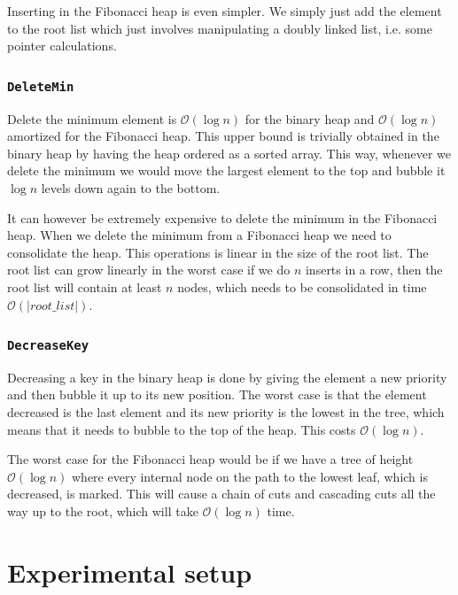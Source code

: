 \documentclass[a4paper,oneside,article,11pt]{memoir}
\begin{document}
Inserting in the Fibonacci heap is even simpler. We simply just add the element to the root list which just involves manipulating a doubly linked list, i.e. some pointer calculations. 

\subsection{\texttt{DeleteMin}}
Delete the minimum element is $\mathcal{O}(\log{n})$ for the binary heap and $\mathcal{O}(\log{n})$ amortized for the Fibonacci heap. This upper bound is trivially obtained in the binary heap by having the heap ordered as a sorted array. This way, whenever we delete the minimum we would move the largest element to the top and bubble it $\log n$ levels down again to the bottom.

It can however be extremely expensive to delete the minimum in the Fibonacci heap. When we delete the minimum from a Fibonacci heap we need to consolidate the heap. This operations is linear in the size of the root list. The root list can grow linearly in the worst case if we do $n$ inserts in a row, then the root list will contain at least $n$ nodes, which needs to be consolidated in time $\mathcal{O}(\vert root\_list \vert)$.

\subsection{\texttt{DecreaseKey}}
Decreasing a key in the binary heap is done by giving the element a new priority and then bubble it up to its new position. The worst case is that the element decreased is the last element and its new priority is the lowest in the tree, which means that it needs to bubble to the top of the heap. This costs $\mathcal{O}(\log n)$.

The worst case for the Fibonacci heap would be if we have a tree of height $\mathcal{O}(\log n)$ where every internal node on the path to the lowest leaf, which is decreased, is marked. This will cause a chain of cuts and cascading cuts all the way up to the root, which will take $\mathcal{O}(\log n)$ time.

\chapter{Experimental setup}
\label{chtp:experiment_setup}
\end{document}
